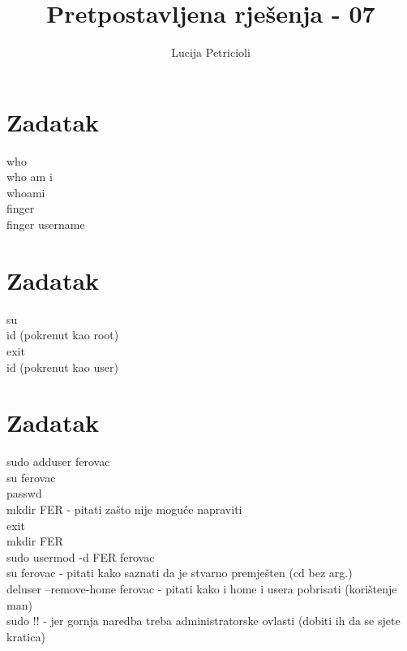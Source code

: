\documentclass[12pt,a4paper]{article}
\begin{document}
	\title{Pretpostavljena rješenja - 07}
	\maketitle
	\author{Lucija Petricioli}
	\section{Zadatak}
	who \\
	who am i \\
	whoami \\
	finger \\
	finger username \\
	
	\section{Zadatak}
	su \\
	id (pokrenut kao root) \\
	exit \\
	id (pokrenut kao user) \\
	
	\section{Zadatak}
	sudo adduser ferovac \\
	su ferovac \\
	passwd \\
	mkdir FER - pitati zašto nije moguće napraviti \\
	exit \\
	mkdir FER \\
	sudo usermod -d FER ferovac \\
	su ferovac  - pitati kako saznati da je stvarno premješten (cd bez arg.) \\
	deluser --remove-home ferovac - pitati kako i home i usera pobrisati (korištenje man)\\
	sudo !! - jer gornja naredba treba administratorske ovlasti (dobiti ih da se sjete kratica) \\
	
\end{document}
